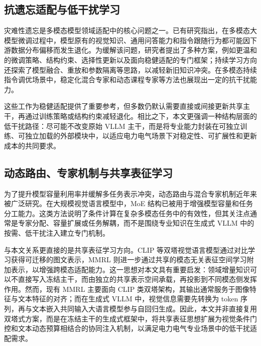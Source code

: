 \documentclass[journal]{IEEEtran}
\begin{document}
\subsection{抗遗忘适配与低干扰学习}

灾难性遗忘是多模态模型领域适配中的核心问题之一。已有研究指出，在多模态大模型微调过程中，模型原有的视觉知识、通用问答能力和指令跟随行为都可能因下游数据分布偏移而发生退化\cite{zhai2023investigating}。为缓解该问题，研究者提出了多种方案，例如更温和的微调策略、结构约束、选择性更新以及面向稳健适配的专门框架\cite{zhu2024model,li2026fine}；持续学习方向还探索了模型融合、重放和参数隔离等思路，以减轻新旧知识冲突\cite{gao2025enhanced}。在多模态持续指令调优场景中，稳定化混合专家和动态课程专家等方法也展现出一定的抗干扰能力\cite{tuning83same,ge2025dynamic}。

这些工作为稳健适配提供了重要参考，但多数仍默认需要直接或间接更新共享主干，再通过训练策略或结构约束减轻退化。相比之下，本文更强调一种结构层面的低干扰路径：尽可能不改变原始 VLLM 主干，而是将专业能力封装在可独立训练、可独立加载的外部模块中，以适应电力电气场景下对稳定性、可扩展性和更新成本的共同要求。

\subsection{动态路由、专家机制与共享表征学习}

为了提升模型容量利用率并缓解多任务表示冲突，动态路由与混合专家机制近年来被广泛研究。在大规模视觉语言模型中，MoE 结构已被用于增强模型容量和任务分工能力\cite{lin2026moe}。这类方法说明了条件计算在复杂多模态任务中的有效性，但其关注点通常是专家分配、容量扩展或任务解耦，而不是围绕专业知识在生成式 VLLM 中的按需、低干扰注入建立专门机制。

与本文关系更直接的是共享表征学习方向。CLIP 等双塔视觉语言模型通过对比学习获得可迁移的图文表示\cite{radford2021learning}，MMRL 则进一步通过共享的模态无关表征空间学习附加表示，以增强跨模态适配能力\cite{guo2025mmrl}。这一思想对本文具有重要启发：领域增量知识可以不直接写入冻结主干，而由独立的共享表示空间承载，再投影到不同模态侧发挥作用。然而，现有 MMRL 主要面向 CLIP 类双塔架构，其输出通常服务于图像特征与文本特征的对齐；而在生成式 VLLM 中，视觉信息需要先转换为 token 序列，再与文本嵌入共同输入大语言模型参与自回归生成\cite{liu2023visual,bai2025qwen3}。因此，本文并非直接复用双塔式方案，而是在冻结主干的生成式框架中，将共享表征思想扩展为视觉条件门控和文本动态预算相结合的协同注入机制，以满足电力电气专业场景中的低干扰适配需求。
\end{document}

